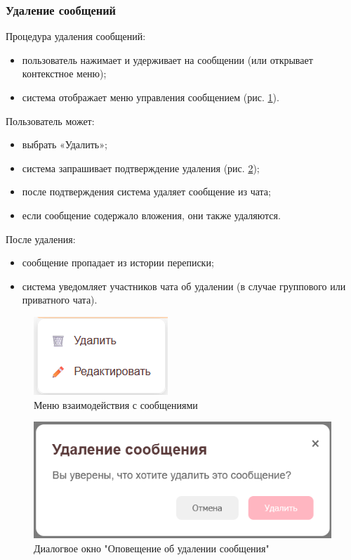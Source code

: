 \subsubsection{Удаление сообщений}  
Процедура удаления сообщений:
\begin{itemize}
	\item пользователь нажимает и удерживает на сообщении (или открывает контекстное меню);
	\item система отображает меню управления сообщением (рис. \ref{fig:message-menu}).
\end{itemize}

Пользователь может:
\begin{itemize}
	\item выбрать «Удалить»;
	\item система запрашивает подтверждение удаления (рис. \ref{fig:message-delete});
	\item после подтверждения система удаляет сообщение из чата;
	\item если сообщение содержало вложения, они также удаляются.
\end{itemize}

После удаления:
\begin{itemize}
	\item сообщение пропадает из истории переписки;
	\item система уведомляет участников чата об удалении (в случае группового или приватного чата).
\end{itemize}

\begin{figure}[h]
	\centering
	\includegraphics[width=0.8\linewidth]{"images/Меню взаимодействия с сообщениями"}
	\caption{Меню взаимодействия с сообщениями}
	\label{fig:message-menu}
\end{figure}

\begin{figure}[h]
	\centering
	\includegraphics[width=0.8\linewidth]{"images/Окно уточнения удаления"}
	\caption{Диалогвое окно "Оповещение об удалении сообщения"}
	\label{fig:message-delete}
\end{figure}

